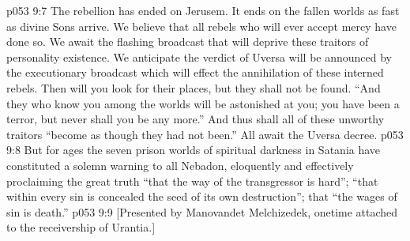 \vs p053 9:7 The rebellion has ended on Jerusem. It ends on the fallen worlds as fast as divine Sons arrive. We believe that all rebels who will ever accept mercy have done so. We await the flashing broadcast that will deprive these traitors of personality existence. We anticipate the verdict of Uversa will be announced by the executionary broadcast which will effect the annihilation of these interned rebels. Then will you look for their places, but they shall not be found. “And they who know you among the worlds will be astonished at you; you have been a terror, but never shall you be any more.” And thus shall all of these unworthy traitors “become as though they had not been.” All await the Uversa decree.
\vs p053 9:8 But for ages the seven prison worlds of spiritual darkness in Satania have constituted a solemn warning to all Nebadon, eloquently and effectively proclaiming the great truth “that the way of the transgressor is hard”; “that within every sin is concealed the seed of its own destruction”; that “the wages of sin is death.”
\vsetoff
\vs p053 9:9 [Presented by Manovandet Melchizedek, onetime attached to the receivership of Urantia.]
